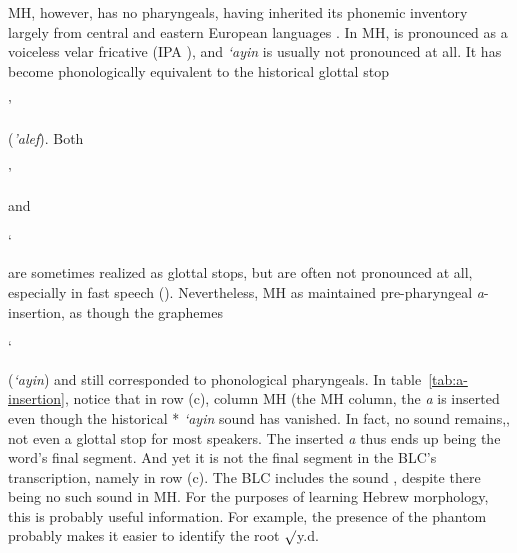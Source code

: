 \ac{MH}, however, has no pharyngeals, having inherited its phonemic inventory 
largely from central and eastern European languages \citep{montoya:2014}. In \ac{MH}, \textipa{[\textcrh]} 
is pronounced as a voiceless velar fricative (IPA \textipa{[x]}), and \textit{`ayin} 
is usually not pronounced at all. It has become phonologically 
equivalent to the historical glottal stop 
\begin{cjhebrew}'\end{cjhebrew} (\textit{'alef}). 
Both \begin{cjhebrew}'\end{cjhebrew} and \begin{cjhebrew}`\end{cjhebrew} 
are sometimes realized as glottal stops, but are often not pronounced at all, 
especially in fast speech (\citep{matras-and-schiff:2005,berman:1985}). Nevertheless,
\ac{MH} as maintained pre-pharyngeal \textit{a}-insertion, as though the graphemes 
\begin{cjhebrew}`\end{cjhebrew} (\textit{`ayin}) and \textit{}
still corresponded to phonological pharyngeals. In table~\ref{tab:a-insertion}, notice that in row (c), column \ac{MH} (the \ac{MH} column,
the \textit{a} is inserted even though the historical *\textipa{\textrevglotstop} \textit{`ayin} sound has vanished. In fact, no sound remains,,
not even a glottal stop for most speakers. The inserted \textit{a} thus ends up being the word's final segment. And yet it is not the final segment
in the \ac{BLC}'s transcription, namely  in row (c). The \ac{BLC} includes 
the sound , despite there being no such sound in \ac{MH}. 
For the purposes of learning Hebrew morphology, this is probably useful information. 
For example, the presence of the phantom  
probably makes it easier to identify the root 
$\surd$y.d.


